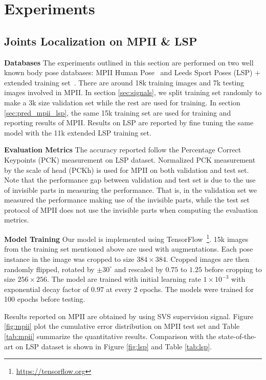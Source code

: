 \section{Experiments}


\subsection{Joints Localization on MPII \& LSP}

\noindent\textbf{Databases} The experiments outlined in this section are performed on two well known body pose databases: MPII Human Pose~\cite{andriluka20142d} and Leeds Sport Poses (LSP) + extended training set~\cite{Johnson10}. There are around 18k training images and 7k testing images involved in MPII. In section \ref{sec:signals}, we split training set randomly to make a 3k size validation set while the rest are used for training. In section \ref{sec:pred_mpii_lsp}, the same 15k training set are used for training and reporting results of MPII. Results on LSP are reported by fine tuning the same model with the 11k extended LSP training set.

\noindent\textbf{Evaluation Metrics} The accuracy reported follow the Percentage Correct Keypoints (PCK) measurement on LSP dataset. Normalized PCK measurement by the scale of head (PCKh) is used for MPII on both validation and test set. Note that the performance gap between validation and test set is due to the use of invisible parts in measuring the performance. That is, in the validation set we measured the performance making use of the invisible parts, while the test set protocol of MPII does not use the invisible parts when computing the evaluation metrics.

\noindent\textbf{Model Training} Our model is implemented using TensorFlow~\footnote{\url{https://tensorflow.org}}. 15k images from the training set mentioned above are used with augmentations. Each pose instance in the image was cropped to size $384 \times 384$. Cropped images are then randomly flipped, rotated by $\pm 30^{\circ} $ and rescaled by $0.75$ to $1.25$ before cropping to size $256 \times 256$. The model are trained with initial learning rate $1\times10^{-3}$ with exponential decay factor of $0.97$ at every $2$ epochs. The models were trained for 100 epochs before testing.

Results reported on MPII are obtained by using SVS supervision signal. Figure \ref{fig:mpii} plot the cumulative error distribution on MPII test set and Table \ref{tab:mpii} summarize the quantitative results. Comparison with the state-of-the-art on LSP dataset is shown in Figure \ref{fig:lsp} and Table \ref{tab:lsp}. 

